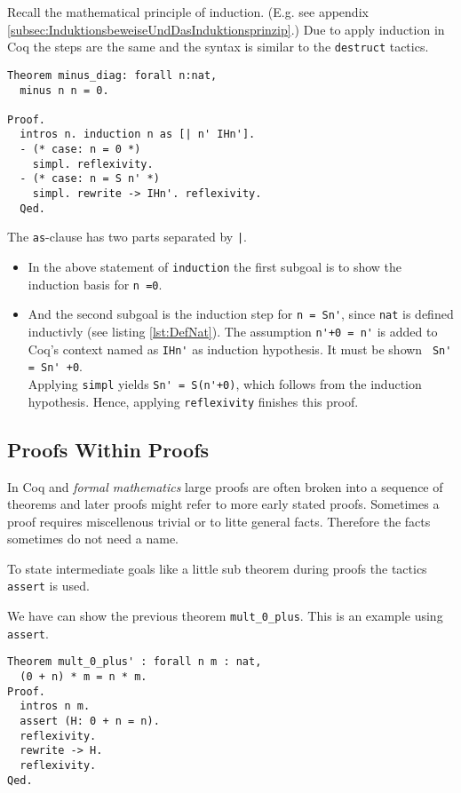 Recall the mathematical principle of induction. (E.g. see appendix \ref{subsec:InduktionsbeweiseUndDasInduktionsprinzip}.)
Due to apply induction in Coq the steps are the same and the syntax is similar to the \lstinline!destruct! tactics.
 

\begin{lstlisting}[caption = \lstinline!minus_diag!, label =lst:minus_diag] 
Theorem minus_diag: forall n:nat,
  minus n n = 0.
  
Proof.
  intros n. induction n as [| n' IHn'].
  - (* case: n = 0 *)
    simpl. reflexivity.
  - (* case: n = S n' *)
    simpl. rewrite -> IHn'. reflexivity.  
  Qed.
\end{lstlisting}

The \lstinline!as!-clause has two parts separated by \lstinline!|!.
\begin{itemize}
	\item In the above statement of \lstinline!induction! the first subgoal is to show the induction basis for \lstinline!n =0!.
	\item And the second subgoal is the induction step for \lstinline!n = Sn'!, since \lstinline!nat! is defined inductivly (see listing  \ref{lst:DefNat}).
	      The assumption \lstinline!n'+0 = n'! is added to Coq's context named as \lstinline!IHn'! as induction hypothesis.
		  It must be shown \lstinline! Sn' = Sn' +0!. \\
          Applying \lstinline!simpl! yields \lstinline!Sn' = S(n'+0)!, which follows from the induction hypothesis. 
          Hence, applying \lstinline!reflexivity! finishes this proof.
\end{itemize} 

\subsection{Proofs Within Proofs}

In Coq and {\itshape formal mathematics} large proofs are often broken into a sequence of theorems and later proofs might refer to more early stated proofs.
Sometimes a proof requires miscellenous trivial or to litte general facts. 
Therefore the facts sometimes do not need a name.

To state intermediate goals like a little sub theorem during proofs the tactics \lstinline!assert! is used.


\begin{example}
We have can show the previous theorem \lstinline!mult_0_plus!. 
This is an example using \lstinline!assert!. 

\begin{lstlisting}
Theorem mult_0_plus' : forall n m : nat,
  (0 + n) * m = n * m. 
Proof.
  intros n m.
  assert (H: 0 + n = n).  
  reflexivity. 
  rewrite -> H.
  reflexivity.  
Qed.
\end{lstlisting}
\end{example}

